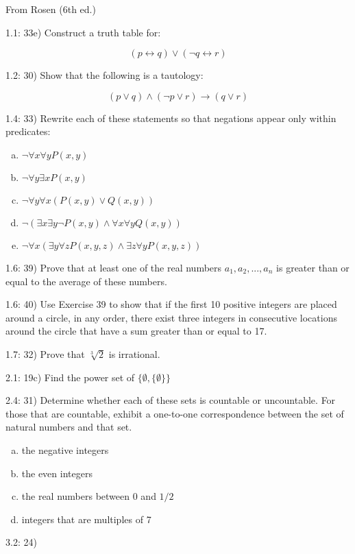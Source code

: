\documentclass{report}
\begin{document}
From Rosen (6th ed.)

1.1: 33e) Construct a truth table for:

\[
(p \leftrightarrow q) \vee (\neg q \leftrightarrow r)
\]

1.2: 30) Show that the following is a tautology:

\[
(p \vee q) \wedge (\neg p \vee r) \rightarrow (q \vee r)
\]

1.4: 33) Rewrite each of these statements so that negations appear only within predicates:

\begin{enumerate}[a)]
\item $ \neg \forall x \forall y P(x,y) $
\item $ \neg \forall y \exists x P(x,y) $
\item $ \neg \forall y \forall x (P(x,y) \vee Q(x,y)) $
\item $ \neg ( \exists x \exists y \neg P(x,y) \wedge \forall x \forall y Q(x,y)) $
\item $ \neg \forall x ( \exists y \forall z P(x,y,z) \wedge \exists z \forall y P(x,y,z)) $
\end{enumerate}

1.6: 39) Prove that at least one of the real numbers $a_1,a_2,...,a_n$ is greater than or equal to the average of these numbers.

1.6: 40) Use Exercise 39 to show that if the first 10 positive integers are placed around a circle, in any order, there exist three integers in consecutive locations around the circle that have a sum greater than or equal to 17.

1.7: 32) Prove that $\sqrt[3]{2}$ is irrational.

2.1: 19c) Find the power set of $ \{ \emptyset , \{ \emptyset \} \} $

2.4: 31) Determine whether each of these sets is countable or uncountable.  For those that are countable, exhibit a one-to-one correspondence between the set of natural numbers and that set.

\begin{enumerate}[a)]
\item the negative integers
\item the even integers
\item the real numbers between 0 and $1/2$
\item integers that are multiples of 7
\end{enumerate}

3.2: 24)
\end{document}

